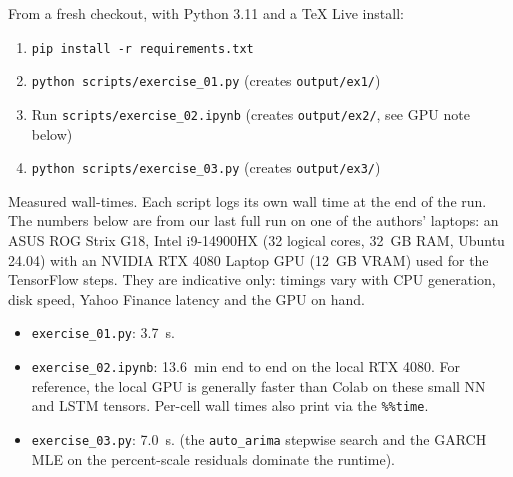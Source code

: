 \documentclass[11pt,a4paper]{article}
\newcommand{\code}[1]{\texttt{#1}}
\begin{document}
From a fresh checkout, with Python 3.11 and a TeX Live install:

\begin{enumerate}[leftmargin=*,itemsep=0.1em]
\item \code{pip install -r requirements.txt}
\item \code{python scripts/exercise\_01.py} (creates \code{output/ex1/})
\item Run \code{scripts/exercise\_02.ipynb} (creates \code{output/ex2/}, see GPU note below)
\item \code{python scripts/exercise\_03.py} (creates \code{output/ex3/})
\end{enumerate}

Measured wall-times. Each script logs its own wall time at the
end of the run. The numbers below are from our last full run on one of
the authors' laptops: an ASUS ROG Strix G18, Intel
i9-14900HX (32 logical cores, 32~GB RAM, Ubuntu 24.04) with an
NVIDIA RTX 4080 Laptop GPU (12~GB VRAM) used for the TensorFlow
steps. They are indicative only: timings vary with CPU generation, disk
speed, Yahoo Finance latency and the GPU on hand.

\vspace{12pt}

\begin{itemize}[leftmargin=*,itemsep=0.05em]
\item[] \code{exercise\_01.py}: 3.7~s.
\item[] \code{exercise\_02.ipynb}: 13.6~min end to end on the local
      RTX 4080. For reference, the local GPU is generally faster than
      Colab on these small NN and LSTM tensors. Per-cell wall times also
      print via the \code{\%\%time}.
\item[] \code{exercise\_03.py}: 7.0~s. (the \code{auto\_arima}
      stepwise search and the GARCH MLE on the percent-scale residuals
      dominate the runtime).
\end{itemize}
\end{document}
